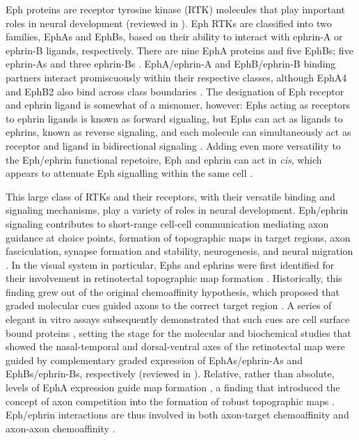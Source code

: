 Eph proteins are receptor tyrosine kinase (RTK) molecules that play important roles in neural development (reviewed in ).
Eph RTKs are classified into two families, EphAs and EphBs, based on their ability to interact with ephrin-A or ephrin-B ligands, respectively.
There are nine EphA proteins and five EphBs; five ephrin-As and three ephrin-Bs \cite{lisabeth2013eph,kania2016mechanisms}.
EphA/ephrin-A and EphB/ephrin-B binding partners interact promiscuously within their respective classes, although EphA4 and EphB2 also bind across class boundaries \cite{lisabeth2013eph,kania2016mechanisms}.
The designation of Eph receptor and ephrin ligand is somewhat of a misnomer, however: Ephs acting as receptors to ephrin ligands is known as forward signaling, but Ephs can act as ligands to ephrins, known as reverse signaling, and each molecule can simultaneously act as receptor and ligand in bidirectional signaling \cite{kania2016mechanisms,egea2007bidirectional}.
Adding even more versatility to the Eph/ephrin functional repetoire, Eph and ephrin can act in \emph{cis}, which appears to attenuate Eph signalling within the same cell \cite{marquardt2005coexpressed,kao2011ephrin,carvalho2006silencing}.

This large class of RTKs and their receptors, with their versatile binding and signaling mechanisms, play a variety of roles in neural development.
Eph/ephrin signaling contributes to short-range cell-cell communication mediating axon guidance at choice points, formation of topographic maps in target regions, axon fasciculation, synapse formation and stability, neurogenesis, and neural migration \cite{kania2016mechanisms,klein2014ephrin}.
In the visual system in particular, Ephs and ephrins were first identified for their involvement in retinotectal topographic map formation \cite{cheng1995complementary,drescher1995vitro}.
Historically, this finding grew out of the original chemoaffinity hypothesis, which proposed that graded molecular cues guided axons to the correct target region \cite{attardi1963preferential,sperry1963chemoaffinity}.
A series of elegant in vitro assays subsequently demonstrated that such cues are cell surface bound proteins \cite{walter1987recognition,walter1987avoidance,walter1990axonal}, setting the stage for the molecular and biochemical studies that showed the nasal-temporal and dorsal-ventral axes of the retinotectal map were guided by complementary graded expression of EphAs/ephrin-As and EphBs/ephrin-Bs, respectively (reviewed in ).
Relative, rather than absolute, levels of EphA expression guide map formation \cite{brown2000topographic}, a finding that introduced the concept of axon competition into the formation of robust topographic maps \cite{feldheim2010visual,triplett2012eph}.
Eph/ephrin interactions are thus involved in both axon-target chemoaffinity and axon-axon chemoaffinity \cite{weth2014chemoaffinity}.
